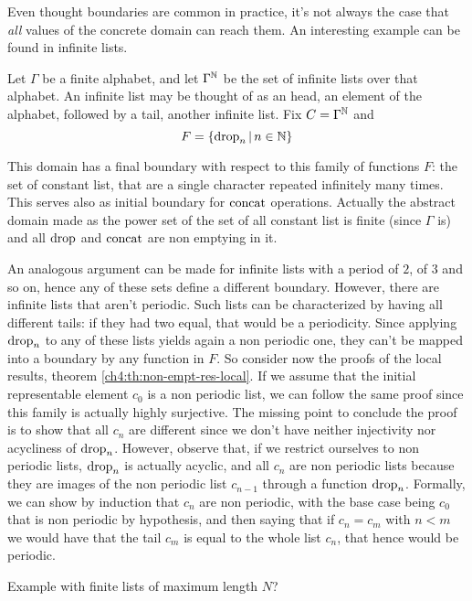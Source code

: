 Even thought boundaries are common in practice, it's not always the case that \textit{all} values of the concrete domain can reach them. An interesting example can be found in infinite lists.
\begin{example}\label{ch4:ex:infinite-lists-fix-c0}
	Let $\Gamma$ be a finite alphabet, and let $\Gamma^{\mathbb{N}}$ be the set of infinite lists over that alphabet. An infinite list may be thought of as an head, an element of the alphabet, followed by a tail, another infinite list.
	Fix $C = \Gamma^{\mathbb{N}}$ and
	\[
	F = \{ \text{drop}_n \,\vert\, n \in \mathbb{N} \}
	\]

	This domain has a final boundary with respect to this family of functions $F$: the set of constant list, that are a single character repeated infinitely many times.
	This serves also as initial boundary for $\text{concat}$ operations. Actually the abstract domain made as the power set of the set of all constant list is finite (since $\Gamma$ is) and all $\text{drop}$ and $\text{concat}$ are non emptying in it.

	An analogous argument can be made for infinite lists with a period of $2$, of $3$ and so on, hence any of these sets define a different boundary.
	However, there are infinite lists that aren't periodic. Such lists can be characterized by having all different tails: if they had two equal, that would be a periodicity. Since applying $\text{drop}_n$ to any of these lists yields again a non periodic one, they can't be mapped into a boundary by any function in $F$.
	So consider now the proofs of the local results, theorem \ref{ch4:th:non-empt-res-local}. If we assume that the initial representable element $c_0$ is a non periodic list, we can follow the same proof since this family is actually highly surjective. The missing point to conclude the proof is to show that all $c_n$ are different since we don't have neither injectivity nor acycliness of $\text{drop}_n$.
	However, observe that, if we restrict ourselves to non periodic lists, $\text{drop}_n$ is actually acyclic, and all $c_n$ are non periodic lists because they are images of the non periodic list $c_{n-1}$ through a function $\text{drop}_n$.
	Formally, we can show by induction that $c_n$ are non periodic, with the base case being $c_0$ that is non periodic by hypothesis, and then saying that if $c_n = c_m$ with $n < m$ we would have that the tail $c_m$ is equal to the whole list $c_n$, that hence would be periodic.
\end{example}

\todo{}
Example with finite lists of maximum length $N$?

